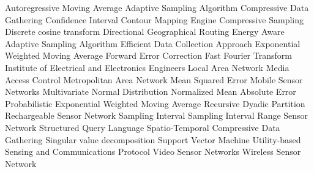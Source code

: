 \begin{acronym}[YTM]
  {Autoregressive Moving Average}
   {Adaptive Sampling Algorithm}
   {Compressive Data Gathering}
    {Confidence Interval}
   {Contour Mapping Engine}
    {Compressive Sampling}
   {Discrete cosine transform}
   {Directional Geographical Routing}
  {Energy Aware Adaptive Sampling Algorithm}
  {Efficient Data Collection Approach}
  {Exponential Weighted Moving Average}
   {Forward Error Correction}
   {Fast Fourier Transform}
  {Institute of Electrical and Electronics Engineers}
   {Local Area Network}
   {Media Access Control}
   {Metropolitan Area Network}
   {Mean Squared Error}
   {Mobile Sensor Networks}
   {Multivariate Normal Distribution}
  {Normalized Mean Absolute Error}
 {Probabilistic Exponential Weighted Moving Average}
   {Recursive Dyadic Partition}
   {Rechargeable Sensor Network}
    {Sampling Interval}
   {Sampling Interval Range}
    {Sensor Network}
   {Structured Query Language}
 {Spatio-Temporal Compressive Data Gathering}
   {Singular value decomposition}
   {Support Vector Machine}
  {Utility-based Sensing and Communications Protocol}
   {Video Sensor Networks}
   {Wireless Sensor Network}
\end{acronym}